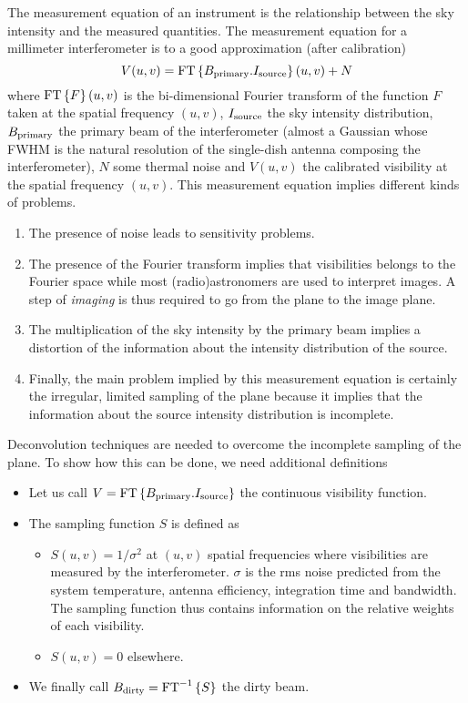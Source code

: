 The measurement equation of an instrument is the relationship between the
sky intensity and the measured quantities. The measurement equation for a
millimeter interferometer is to a good approximation (after calibration)
\begin{equation}
  V(u,v) = \mbox{FT}\displaystyle\left\{ B_{\mathrm{primary}}.I_{\mathrm{source}} \right\}(u,v)+N
\end{equation}
where $\mbox{FT}\displaystyle\left\{ F \right\}(u,v)$ is the bi-dimensional Fourier transform of
the function $F$ taken at the spatial frequency $(u,v)$, 
$I_{\mathrm{source}}$
the sky intensity distribution, $B_{\mathrm{primary}}$ the primary beam of the
interferometer (almost a Gaussian whose FWHM is the natural resolution of the
single-dish antenna composing the interferometer), $N$ some thermal noise
and $V(u,v)$ the calibrated visibility at the spatial frequency $(u,v)$.
This measurement equation implies different kinds of problems.
\begin{enumerate}
\item The presence of noise leads to sensitivity problems.
\item The presence of the Fourier transform implies that visibilities
  belongs to the Fourier space while most (radio)astronomers are used to
  interpret images. A step of \emph{imaging} is thus required to go
  from the \uv{} plane to the image plane.
\item The multiplication of the sky intensity by the primary beam implies a
  distortion of the information about the intensity distribution of the
  source.
\item Finally, the main problem implied by this measurement equation is
  certainly the irregular, limited sampling of the \uv{} plane because it
  implies that the information about the source intensity distribution is
  incomplete.
\end{enumerate}
Deconvolution techniques are needed to overcome the incomplete
sampling of the \uv{} plane. To show how this can be done, we need additional definitions
\begin{itemize}
\item Let us call $V = \mbox{FT}\displaystyle\left\{ B_{\mathrm{primary}}.I_{\mathrm{source}} \right\}$ the
  continuous visibility function.
\item The sampling function $S$ is defined as
  \begin{itemize}
  \item $S(u,v) = 1/\sigma^2$ at $(u,v)$ spatial frequencies where
    visibilities are measured by the interferometer. $\sigma{}$ is the rms
    noise predicted from the system temperature, antenna efficiency,
    integration time and bandwidth. The sampling function thus contains
    information on the relative weights of each visibility.
  \item $S(u,v) = 0$ elsewhere.
  \end{itemize}
\item We finally call $B_{\mathrm{dirty}} = \mbox{FT}^{-1} \displaystyle\left\{ S \right\}$ the dirty
  beam.
\end{itemize}
